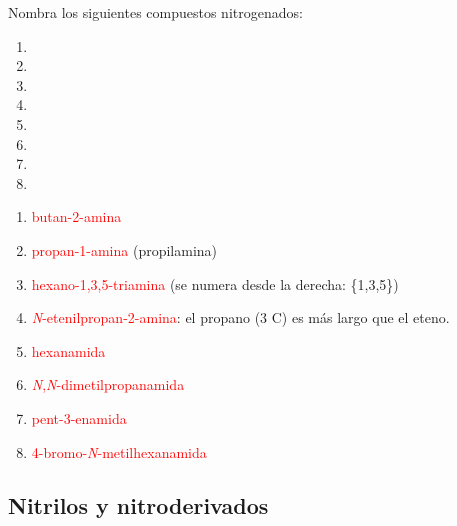 \begin{exercise}
    Nombra los siguientes compuestos nitrogenados:
    \begin{enumerate}[label=\alph*)]
        \item {}
        \item {}
        \item {}
        \item {}
        \item {}
        \item {}
        \item {}
        \item {}
    \end{enumerate}
    \begin{solu}
        \begin{enumerate}[label=\alph*)]
            \item \textcolor{red}{butan-2-amina}
            \item \textcolor{red}{propan-1-amina} (propilamina)
            \item \textcolor{red}{hexano-1,3,5-triamina} (se numera desde la derecha: \{1,3,5\})
            \item \textcolor{red}{\textit{N}-etenilpropan-2-amina}: el propano (3 C) es más largo que el eteno.
            \item \textcolor{red}{hexanamida}
            \item \textcolor{red}{\textit{N},\textit{N}-dimetilpropanamida}
            \item \textcolor{red}{pent-3-enamida}
            \item \textcolor{red}{4-bromo-\textit{N}-metilhexanamida}
        \end{enumerate}
    \end{solu}
\end{exercise}

\subsection*{Nitrilos y nitroderivados}

